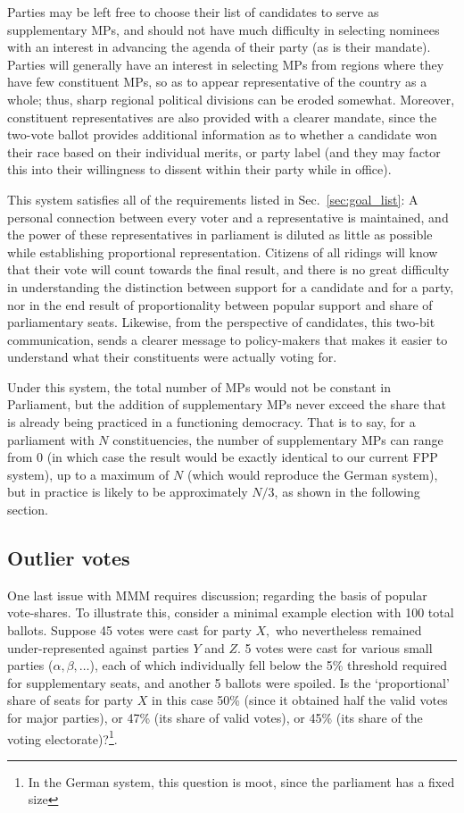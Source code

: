 \documentclass[DIV=calc, paper=a4, fontsize=11pt, twocolumn]{scrartcl}	 %
\begin{document}
Parties may be left free to choose their list of candidates to serve as supplementary MPs, and should not have much difficulty in selecting nominees with an interest in advancing the agenda of their party (as is their mandate). Parties will generally have an interest in selecting MPs from regions where they have few constituent MPs, so as to appear representative of the country as a whole; thus, sharp regional political divisions can be eroded somewhat.
Moreover, constituent representatives are also provided with a clearer mandate, since the two-vote ballot provides additional information as to whether a candidate won their race based on their individual merits, or party label (and they may factor this into their willingness to dissent within their party while in office).



This system satisfies all of the requirements listed in Sec.~\ref{sec:goal_list}: A personal connection between every voter and a representative is maintained, and the power of these representatives in parliament is diluted as little as possible while establishing proportional representation. 
Citizens of all ridings will know that their vote will count towards the final result, and there is no great difficulty in understanding the  distinction between support for a candidate and for a party, nor in the end result of proportionality between popular support and share of parliamentary seats.
Likewise, from the perspective of candidates, this two-bit communication, sends a clearer message to policy-makers that makes it easier to understand what their constituents were actually voting for.

Under this system, the total number of MPs would not be constant in Parliament, but the addition of supplementary MPs never exceed the share that is already being practiced in a functioning democracy. That is to say, for a parliament with $N$ constituencies, the number of supplementary MPs can range from 0 (in which case the result would be exactly identical to our current FPP system), up to a maximum of $N$ (which would reproduce the German system), but in practice is likely to be approximately $N/3$, as shown in the following section.

\subsection{Outlier votes}
One last issue with MMM requires discussion; regarding the basis of popular vote-shares. To illustrate this, consider a minimal example election with 100 total ballots. Suppose 45 votes were cast for party $X,$ who nevertheless remained under-represented against parties $Y$ and $Z$. 5 votes were cast for various small parties ($\alpha,\beta,\ldots$), each of which individually fell below the 5\% threshold required for supplementary seats, and another 5 ballots were spoiled. 
Is the `proportional' share of seats for party $X$ in this case 50\% (since it obtained half the valid votes for major parties), or 47\% (its share of valid votes), or 45\% (its share of the voting electorate)?\footnote{ In the German system, this question is moot, since the parliament has a fixed size}.
\end{document}
